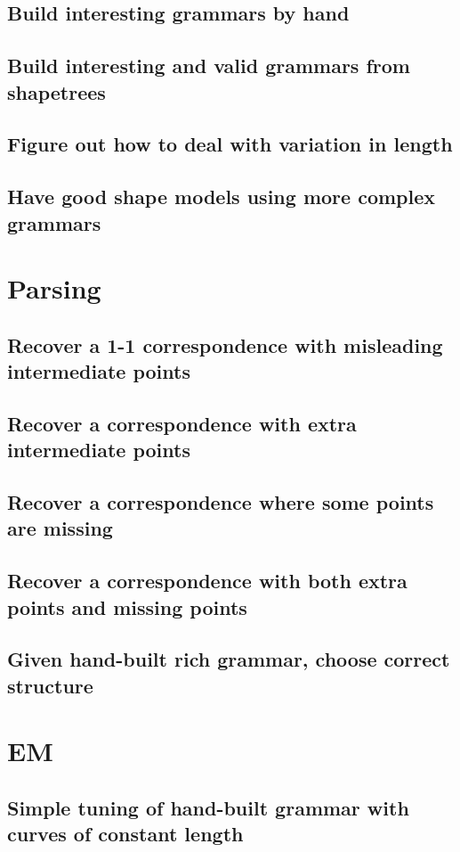 \documentclass{book}
\begin{document}
\subsection{Build interesting grammars by hand}
\label{sec-1_2_3}
\subsection{Build interesting and valid grammars from shapetrees}
\label{sec-1_2_4}
\subsection{Figure out how to deal with variation in length}
\label{sec-1_2_5}
\subsection{Have good shape models using more complex grammars}
\label{sec-1_2_6}
\section{Parsing}
\label{sec-1_3}
\subsection{Recover a 1-1 correspondence with misleading intermediate points}
\label{sec-1_3_1}
\subsection{Recover a correspondence with extra intermediate points}
\label{sec-1_3_2}
\subsection{Recover a correspondence where some points are missing}
\label{sec-1_3_3}
\subsection{Recover a correspondence with both extra points and missing points}
\label{sec-1_3_4}
\subsection{Given hand-built rich grammar, choose correct structure}
\label{sec-1_3_5}
\section{EM}
\label{sec-1_4}
\subsection{Simple tuning of hand-built grammar with curves of constant length}
\label{sec-1_4_1}
\end{document}
